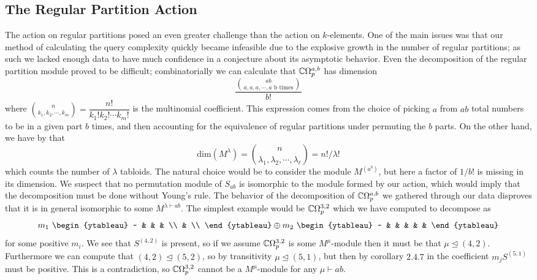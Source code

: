 \documentclass[12pt,twoside]{reedthesis}
\theoremstyle{plain}   %
\theoremstyle{definition}
\theoremstyle{remark}
\numberwithin{equation}{section}
\def\dim{\mathrm{dim}}
\def\normeq{\trianglelefteq}
\begin{document}
\subsection{The Regular Partition Action}
The action on regular partitions posed an even greater challenge than the action on $k$-elements.
One of the main issues was that our method of calculating the query complexity quickly became infeasible due to the explosive growth in the number of regular partitions;
as such we lacked enough data to have much confidence in a conjecture about its asymptotic behavior.
Even the decomposition of the regular partition module proved to be difficult; combinatorially we can calculate that $\mathbb{C} \Omega_p^{a,b}$ has dimension
\[ \dfrac{\binom{ab}{a,a,a,\cdots,a \text{ b times}}}{b!}\]
where $\binom{n}{k_1,k_2,\cdots,k_m} = \dfrac{n!}{k_1! k_2! \cdots k_m!}$ is the multinomial coefficient.
This expression comes from the choice of picking $a$ from $ab$ total numbers to be in a given part $b$ times, and then accounting for the equivalence of regular partitions under permuting the $b$ parts.
On the other hand, we have by \cite[Proposition 2.1.11]{sagan} that
\[ \dim (M^\lambda) = \binom{n}{\lambda_1, \lambda_2, \cdots, \lambda_\ell} =   n! /\lambda!\]
which counts the number of $\lambda$ tabloids.
The natural choice would be to consider the module $M^{(a^b)}$, but here a factor of $1/b!$ is missing in its dimension.
We suspect that no permutation module of $S_{ab}$ is isomorphic to the module formed by our action, which would imply that the decomposition must be done without Young's rule.
The behavior of the decomposition of $\mathbb{C} \Omega_p^{a,b}$ we gathered through our data disproves that it is in general isomorphic to some $M^{\lambda \vdash ab}$.
The simplest example would be $\mathbb{C} \Omega_p^{3,2}$ which we have computed to decompose as
\[
  m_1 \
  \begin{ytableau}
    ~ & & &  \\
    & \\
  \end{ytableau}
  \oplus
  m_2 \
  \begin{ytableau}
    ~ & & & & &
  \end{ytableau}
\]
for some positive $m_i$. We see that $S^{(4,2)}$ is present, so if we assume $\mathbb{C} \Omega_p^{3,2}$ is some $M^\mu$-module then it must be that $ \mu \normeq (4,2)$.
Furthermore we can compute that $(4,2) \normeq (5,2)$, so by transitivity $\mu \normeq (5,1)$, but then by corollary $2.4.7$ in \cite{sagan} the coefficient $m_j S^{(5,1)}$ must be positive.
This is a contradiction, so $\mathbb{C} \Omega_p^{3,2}$ cannot be a $M^\mu$-module for any $\mu \vdash ab$.
\end{document}
